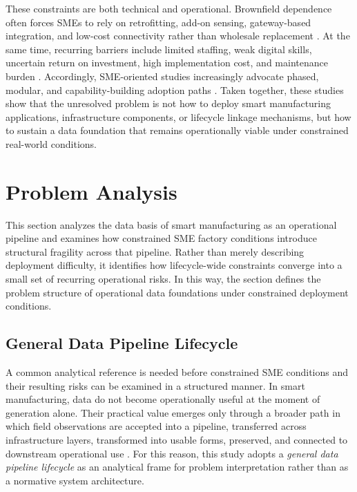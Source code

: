 \documentclass[systems,article,submit,pdftex,moreauthors]{Definitions/mdpi}
\begin{document}
These constraints are both technical and operational. Brownfield dependence often forces SMEs to rely on retrofitting, add-on sensing, gateway-based integration, and low-cost connectivity rather than wholesale replacement \cite{alqoud2022legacy, etz2020retrofit, tran2022retrofitting, park2019opcua}. At the same time, recurring barriers include limited staffing, weak digital skills, uncertain return on investment, high implementation cost, and maintenance burden \cite{huang2025barriers, narwane2022examining, kumar2025digitalization, hulla2021towards}. Accordingly, SME-oriented studies increasingly advocate phased, modular, and capability-building adoption paths \cite{chavez2020capability, krishnan2024challenges, banerjee2024lowcost}. Taken together, these studies show that the unresolved problem is not how to deploy smart manufacturing applications, infrastructure components, or lifecycle linkage mechanisms, but how to sustain a data foundation that remains operationally viable under constrained real-world conditions.

\section{Problem Analysis}
\label{sec:problem_analysis}

This section analyzes the data basis of smart manufacturing as an operational pipeline and examines how constrained SME factory conditions introduce structural fragility across that pipeline. Rather than merely describing deployment difficulty, it identifies how lifecycle-wide constraints converge into a small set of recurring operational risks. In this way, the section defines the problem structure of operational data foundations under constrained deployment conditions.

\subsection{General Data Pipeline Lifecycle}
\label{sec:data_lifecycle}


A common analytical reference is needed before constrained SME conditions and their resulting risks can be examined in a structured manner. In smart manufacturing, data do not become operationally useful at the moment of generation alone. Their practical value emerges only through a broader path in which field observations are accepted into a pipeline, transferred across infrastructure layers, transformed into usable forms, preserved, and connected to downstream operational use \cite{ismail2019manufacturing,raptis2019data}. For this reason, this study adopts a \emph{general data pipeline lifecycle} as an analytical frame for problem interpretation rather than as a normative system architecture.
\end{document}
